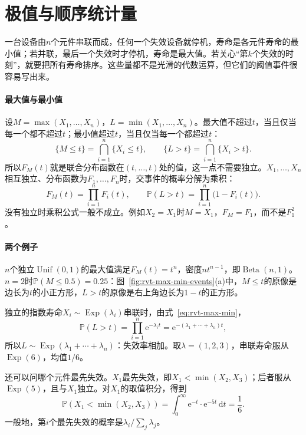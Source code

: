 \section{极值与顺序统计量}
\label{sec:rvt-order-statistics}

一台设备由$n$个元件串联而成，任何一个失效设备就停机，寿命是各元件寿命的最小值；若并联，最后一个失效时才停机，寿命是最大值。若关心“第$k$个失效的时刻”，就要把所有寿命排序。这些量都不是光滑的代数运算，但它们的阈值事件很容易写出来。

\paragraph{最大值与最小值}
设$M=\max(X_1,\ldots,X_n)$，$L=\min(X_1,\ldots,X_n)$。最大值不超过$t$，当且仅当每一个都不超过$t$；最小值超过$t$，当且仅当每一个都超过$t$：
\[
 \{M\leq t\}=\bigcap_{i=1}^{n}\{X_i\leq t\},\qquad \{L>t\}=\bigcap_{i=1}^{n}\{X_i>t\} .
\]
所以$F_M(t)$就是联合分布函数在$(t,\ldots,t)$处的值，这一点不需要独立。$X_1,\ldots,X_n$相互独立、分布函数为$F_1,\ldots,F_n$时，交事件的概率分解为乘积：
\begin{equation}
 F_M(t)=\prod_{i=1}^{n}F_i(t),\qquad \mathbb{P}(L>t)=\prod_{i=1}^{n}\bigl(1-F_i(t)\bigr) .
 \label{eq:rvt-max-min}
\end{equation}
没有独立时乘积公式一般不成立。例如$X_2=X_1$时$M=X_1$，$F_M=F_1$，而不是$F_1^2$。

\paragraph{两个例子}
$n$个独立$\operatorname{Unif}(0,1)$的最大值满足$F_M(t)=t^n$，密度$nt^{n-1}$，即$\operatorname{Beta}(n,1)$。$n=2$时$\mathbb{P}(M\leq0.5)=0.25$：图~\ref{fig:rvt-max-min-events}(a)中，$M\leq t$的原像是边长为$t$的小正方形，$L>t$的原像是右上角边长为$1-t$的正方形。

独立的指数寿命$X_i\sim\operatorname{Exp}(\lambda_i)$串联时，由式~\eqref{eq:rvt-max-min}，
\[
 \mathbb{P}(L>t)=\prod_{i=1}^{n}\mathrm{e}^{-\lambda_it}=\mathrm{e}^{-(\lambda_1+\cdots+\lambda_n)t},
\]
所以$L\sim\operatorname{Exp}(\lambda_1+\cdots+\lambda_n)$：失效率相加。取$\lambda=(1,2,3)$，串联寿命服从$\operatorname{Exp}(6)$，均值$1/6$。

还可以问哪个元件最先失效。$X_1$最先失效，即$X_1<\min(X_2,X_3)$；后者服从$\operatorname{Exp}(5)$，且与$X_1$独立。对$X_1$的取值积分，得到
\[
 \mathbb{P}(X_1<\min(X_2,X_3))=\int_0^\infty\mathrm{e}^{-t}\cdot\mathrm{e}^{-5t}\,\mathrm{d}t=\frac16 .
\]
一般地，第$i$个最先失效的概率是$\lambda_i/\sum_j\lambda_j$。

